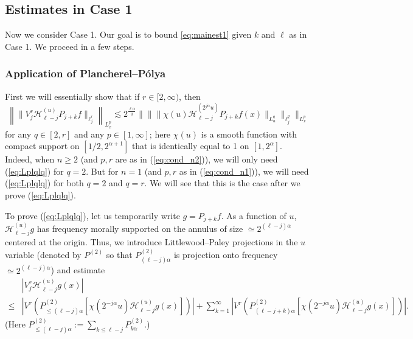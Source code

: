 \documentclass[12pt,leqno]{amsart}
\theoremstyle{plain}
\numberwithin{equation}{section}
\begin{document}
\subsection{Estimates in Case 1} \label{sect4.4}
Now we consider Case 1. Our goal is to bound \eqref{eq:mainest1} given $k$ and $\ell$ as in Case 1. We proceed in a few steps.

\subsubsection{Application of Plancherel--P\'{o}lya}

First we will essentially show that if $r \in [2,\infty)$, then
\begin{equation} \label{eq:Lplqlq}
\left\| \|V_j^{r} \mathcal{H}^{(u)}_{\ell-j} P_{j+k} f \|_{\ell^r_j} \right\|_{L^p_x}  \lesssim 
2^{\frac{\ell \alpha}{q}}  \| \| \| \chi(u) \mathcal{H}^{(2^{j \alpha} u)}_{\ell-j} P_{j+k} f (x) \|_{L^q_u} \|_{\ell^q_j} \|_{L^p_x}
\end{equation}
for any $q \in [2,r]$ and any $p \in [1,\infty]$; here $\chi(u)$ is a smooth function with compact support on $[1/2,2^{\alpha+1}]$ that is identically equal to 1 on $[1,2^{\alpha}]$. Indeed, when $n \geq 2$ (and $p, r$ are as in (\ref{eq:cond_n2})), we will only need (\ref{eq:Lplqlq}) for $q = 2$. But for $n = 1$ (and $p, r$ as in (\ref{eq:cond_n1})), we will need (\ref{eq:Lplqlq}) for both $q = 2$ and $q = r$. We will see that this is the case after we prove (\ref{eq:Lplqlq}).

To prove (\ref{eq:Lplqlq}), let us temporarily write $g = P_{j+k} f$. As a function of $u$, $\mathcal{H}^{(u)}_{\ell-j} g$ has frequency morally supported on the annulus of size $\simeq 2^{(\ell-j)\alpha}$ centered at the origin. Thus, we introduce Littlewood--Paley projections in the $u$ variable (denoted by $P^{(2)}$ so that $P^{(2)}_{(\ell-j) \alpha}$ is projection onto frequency $\simeq 2^{(\ell-j) \alpha}$) and estimate
\begin{equation} \label{lemma1est}
\begin{split}
&|V^r_j \mathcal{H}^{(u)}_{\ell-j} g(x)| \\
\leq & |V^r (P^{(2)}_{\leq (\ell-j)\alpha} [\chi(2^{-j\alpha} u) \mathcal{H}^{(u)}_{\ell-j} g(x)])| + \sum_{k = 1}^{\infty} |V^r (P^{(2)}_{(\ell-j+k)\alpha} [\chi(2^{-j\alpha} u) \mathcal{H}^{(u)}_{\ell-j} g(x)])|.
\end{split}
\end{equation}
(Here $P^{(2)}_{\leq (\ell-j)\alpha} := \sum_{k \leq \ell-j} P^{(2)}_{k \alpha}$.) 
\end{document}
